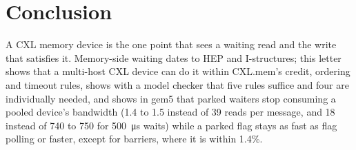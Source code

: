 \documentclass[journal]{IEEEtran}
\begin{document}
\section{Conclusion}
A CXL memory device is the one point that sees a waiting read and the write that satisfies it.
Memory-side waiting dates to HEP and I-structures; this letter shows that a multi-host CXL device can do it within
CXL.mem's credit, ordering and timeout rules, shows with a model checker that five rules suffice and
four are individually needed, and shows in gem5 that parked waiters stop consuming a pooled device's
bandwidth (1.4 to 1.5 instead of 39 reads per message, and 18 instead of 740 to 750 for
\SI{500}{\micro\second} waits) while a parked flag stays as fast as flag polling or faster, except for barriers,
where it is within 1.4\%.



\end{document}
